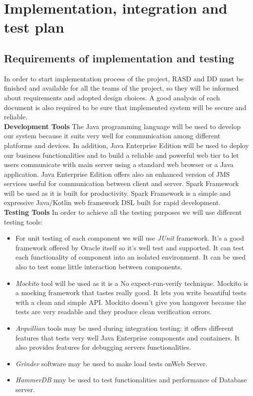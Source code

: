 \documentclass[a4paper, hidelinks, 12pt]{report}
\begin{document}
	\chapter{Implementation, integration and test plan}
	\section{Requirements of implementation and testing}
In order to start implementation process of the project, RASD and DD must be finished and available for all the teams of the project, so they will be informed about requirements and adopted design choices. A good analysis of each document is also required to be sure that implemented system will be secure and reliable.\\

\textbf{Development Tools} The Java programming language will be used to develop our system because it suits very well for communication among different platforms and devices. In addition, Java Enterprise Edition will be used to deploy our business functionalities and to build a reliable and powerful web tier to let users communicate with main server using a standard web browser or a Java application. Java Enterprise Edition offers also an enhanced version of JMS services useful for communication between client and server. Spark Framework will be used as it is built for productivity. Spark Framework is a simple and expressive Java/Kotlin web framework DSL built for rapid development. \\

\textbf{Testing Tools} In order to achieve all the testing purposes we will use different testing tools:
\begin{itemize}
\item{} For unit testing of each component we will use \textit{JUnit} framework. It’s a good framework offered by Oracle itself so it’s well test and supported. It can test each functionality of component into an isolated environment. It can be used also to test some little interaction between components.
\item{}\textit{Mockito} tool will be used as it is a No expect-run-verify technique. Mockito is a mocking framework that tastes really good. It lets you write beautiful tests with a clean and simple API. Mockito doesn’t give you hangover because the tests are very readable and they produce clean verification errors.
\item{} \textit{Arquillian} tools may be used during integration testing: it offers different features that tests very well Java Enterprise components and containers. It also provides features for debugging servers functionalities.
\item{} \textit{Grinder} software may be used to make load tests onWeb Server.
\item{} \textit{HammerDB} may be used to test functionalities and performance of Database server.
\end{itemize}
\end{document}
